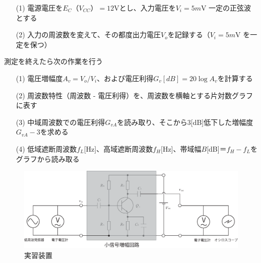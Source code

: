 \documentclass[uplatex,a4paper,11pt,oneside,openany]{jsbook}
\begin{document}
\begin{enumerate}
\item[(1)] 電源電圧を$E_C（V_{CC}）=12$Vとし、入力電圧を$V_i=5m$V 一定の正弦波とする
\item[(2)] 入力の周波数を変えて、その都度出力電圧$V_o$を記録する（$V_i=5m$V を一定を保つ）
\end{enumerate}

測定を終えたら次の作業を行う

\begin{enumerate}
\item[(1)] 電圧増幅度$A_v=V_o/V_i$、および電圧利得$G_v[dB]=20\log A_v$を計算する
\item[(2)] 周波数特性（周波数 - 電圧利得）を、周波数を横軸とする片対数グラフに表す
\item[(3)] 中域周波数での電圧利得$G_{vA}$を読み取り、そこから$3$[dB]低下した増幅度$G_{vA}-3$を求める
\item[(4)] 低域遮断周波数$f_L$[Hz]、高域遮断周波数$f_H$[Hz]、帯域幅$B$[dB]$＝f_H-f_L$をグラフから読み取る
\end{enumerate}

\begin{figure}[H]
  \centering
   \includegraphics[keepaspectratio, scale=0.48, angle=0]
             {figs/eps/exp0.eps}
             \caption{実習装置}
             \label{fig:exp0}
\end{figure}

\end{document}
